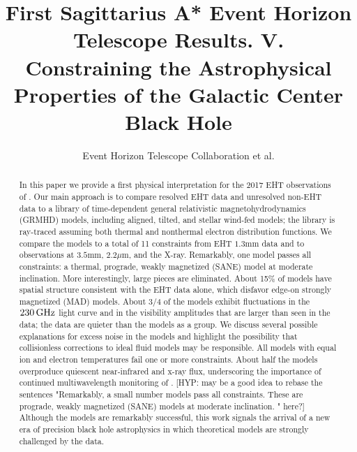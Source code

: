 \documentclass[twocolumn,twocolappendix,tighten,dvipsnames,linenumbers]{aastex63}
\newcommand\note[1]{{\color{OliveGreen}[note: #1]}}
\newcommand\hyp[1]{{\color{Salmon}[HYP: #1]}}
\begin{document}
\title{First Sagittarius A* Event Horizon Telescope Results. V.\\
  Constraining the Astrophysical Properties of the Galactic Center Black Hole}

%
\author{Event Horizon Telescope Collaboration et al.}


\received{\today}
\revised{\today}

\begin{abstract}

In this paper we provide a first physical interpretation for the 2017
EHT observations of \sgra.
Our main approach is to compare resolved EHT data and unresolved
non-EHT data to a library of time-dependent general relativistic
magnetohydrodynamics (GRMHD) models, including aligned, tilted, and
stellar wind-fed models; the library is ray-traced assuming both
thermal and nonthermal electron distribution functions.  We compare
the models to a total of 11 constraints from EHT $1.3$mm data and to observations at $3.5$mm, $2.2\mu$m, and the X-ray.  Remarkably, one model passes all constraints: a thermal, prograde, weakly magnetized (SANE) model at moderate inclination.  More interestingly, large pieces are eliminated.
About 15\% of models have spatial structure consistent with the EHT data alone, which disfavor edge-on strongly magnetized (MAD) models. 
About 3/4 of the models exhibit fluctuations in the $230\,\mathrm{GHz}$
light curve and in the visibility amplitudes that are larger than seen in the data; the data are quieter than the models as a group.
We discuss several possible explanations for excess noise
in the models and highlight the possibility that collisionless
corrections to ideal fluid models may be responsible.
All models with equal ion and electron temperatures fail one or more
constraints.
About half the models overproduce quiescent near-infrared and x-ray
flux, underscoring the importance of continued multiwavelength
monitoring of \sgra.
\hyp{may be a good idea to rebase the sentences "Remarkably, a small number models pass all constraints.  These are prograde, weakly magnetized (SANE) models at moderate inclination.  " here?}
Although the models are remarkably successful, this work
signals the arrival of a new era of precision black hole astrophysics
in which theoretical models are strongly challenged by the data.

\end{abstract}
\end{document}
